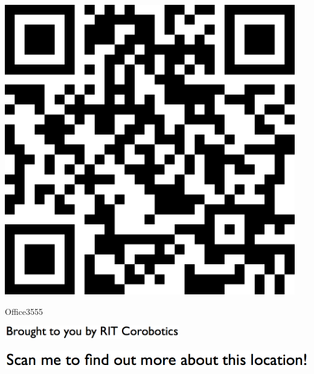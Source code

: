 \documentclass[letterpaper]{article}
\begin{document}
 \begingroup 
 \centerline{\includegraphics[scale=1,width=5in,height=5in]{Office3555.png}} 
 \endgroup 
 \vspace*{\fill} 

 \hfill{\small Office3555} 

  \vspace{0.7in} 
 
 \centerline{\includegraphics[scale=1,width=3in]{text-bottom.png}} 
 
 \pagebreak 
{} 
 \vspace*{\fill} 
 
  \centerline{\includegraphics[scale=1,width=6in]{text-top.png}} 
 
 \vspace{0.5in} 
 
\end{document}
